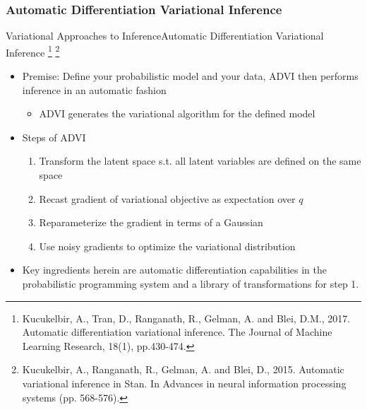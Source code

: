 \documentclass[AERbeamer%
              ,optEnglish%
              ,optBiber%
              ,optBibstyleAlphabetic%
              ,optBeamerClassicFormat%
              ]{AERlatex}%
\begin{document}
\subsubsection*{Automatic Differentiation Variational Inference}
\begin{frame}[c]{Variational Approaches to Inference}{Automatic Differentiation Variational Inference \footnote{Kucukelbir, A., Tran, D., Ranganath, R., Gelman, A. and Blei, D.M., 2017.
                                                                                                                Automatic differentiation variational inference. The Journal of Machine
                                                                                                                Learning Research, 18(1), pp.430-474.}
                                                                                                      \footnote{Kucukelbir, A., Ranganath, R., Gelman, A. and Blei, D., 2015. Automatic
                                                                                                                variational inference in Stan. In Advances in neural information processing
                                                                                                                systems (pp. 568-576).}}
    \centering
    \begin{itemize}
        \item Premise: Define your probabilistic model and your data, ADVI then performs inference in an
              automatic fashion
        \begin{itemize}
            \item ADVI generates the variational algorithm for the defined model
        \end{itemize}
        \item Steps of ADVI
        \begin{enumerate}
            \item Transform the latent space s.t. all latent variables are defined on the same space
            \item Recast gradient of variational objective as expectation over $q$
            \item Reparameterize the gradient in terms of a Gaussian
            \item Use noisy gradients to optimize the variational distribution
        \end{enumerate}
        \item Key ingredients herein are automatic differentiation capabilities in the probabilistic programming
              system and a library of transformations for step 1.
    \end{itemize}
\end{frame}
\end{document}
